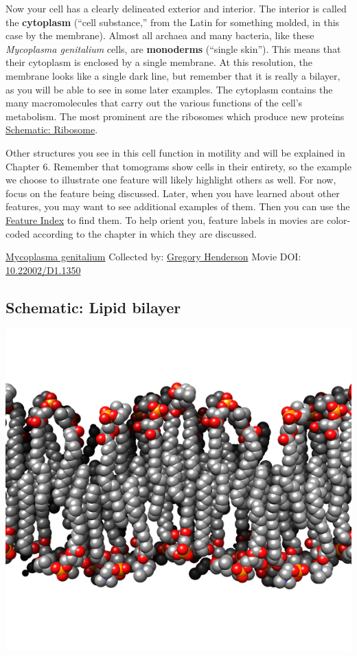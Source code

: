 \documentclass[]{tufte-book}
\begin{document}
Now your cell has a clearly delineated exterior and interior. The interior is called the \textbf{cytoplasm} (``cell substance,'' from the Latin for something molded, in this case by the membrane). Almost all archaea and many bacteria, like these \emph{Mycoplasma genitalium} cells, are \textbf{monoderms} (``single skin''). This means that their cytoplasm is enclosed by a single membrane. At this resolution, the membrane looks like a single dark line, but remember that it is really a bilayer, as you will be able to see in some later examples. The cytoplasm contains the many macromolecules that carry out the various functions of the cell's metabolism. The most prominent are the ribosomes which produce new proteins \protect\hyperlink{Ribosome}{Schematic: Ribosome}.

Other structures you see in this cell function in motility and will be explained in Chapter 6. Remember that tomograms show cells in their entirety, so the example we choose to illustrate one feature will likely highlight others as well. For now, focus on the feature being discussed. Later, when you have learned about other features, you may want to see additional examples of them. Then you can use the \protect\hyperlink{feature-index}{Feature Index} to find them. To help orient you, feature labels in movies are color-coded according to the chapter in which they are discussed.



\hypertarget{htmlwidget-3f061925660799b0d3ad}{}

\label{fig:2-1}\protect\hyperlink{tree}{Mycoplasma genitalium} Collected by: \protect\hyperlink{gregory_henderson}{Gregory Henderson} Movie DOI: \href{https://doi.org/10.22002/D1.1350}{10.22002/D1.1350}

\hypertarget{Lipid_bilayer}{%
\subsection*{Schematic: Lipid bilayer}\label{Lipid_bilayer}}

\includegraphics{img/schematics/2_1_1}
\end{document}

